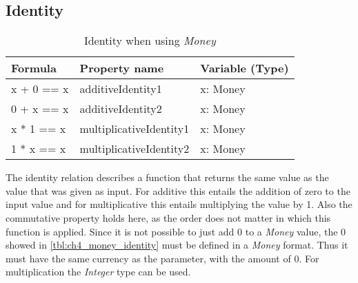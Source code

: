 \subsection*{Identity}
\FloatBarrier
\begin{table}[!ht]
\centering
\begin{tabular}{lll}
\hline
                        \textbf{Formula} & \textbf{Property name}  & \textbf{Variable (Type)} \\ \hline
\rowcolor[HTML]{EFEFEF} x + 0 == x       & additiveIdentity1       & x: Money                 \\
						            0 + x == x       & additiveIdentity2       & x: Money                 \\
\rowcolor[HTML]{EFEFEF} x * 1 == x       & multiplicativeIdentity1 & x: Money                 \\
                        1 * x == x       & multiplicativeIdentity2 & x: Money                 \\ \hline
\end{tabular}
\caption{Identity when using \textit{Money}}
\label{tbl:ch4_money_identity}
\end{table}
\FloatBarrier
The identity relation describes a function that returns the same value as the value that was given as input. For additive this entails the addition of zero to the input value and for multiplicative this entails multiplying the value by 1. Also the commutative property holds here, as the order does not matter in which this function is applied. Since it is not possible to just add 0 to a \textit{Money} value, the 0 showed in \autoref{tbl:ch4_money_identity} must be defined in a \textit{Money} format. Thus it must have the same currency as the parameter, with the amount of 0. For multiplication the \textit{Integer} type can be used.

